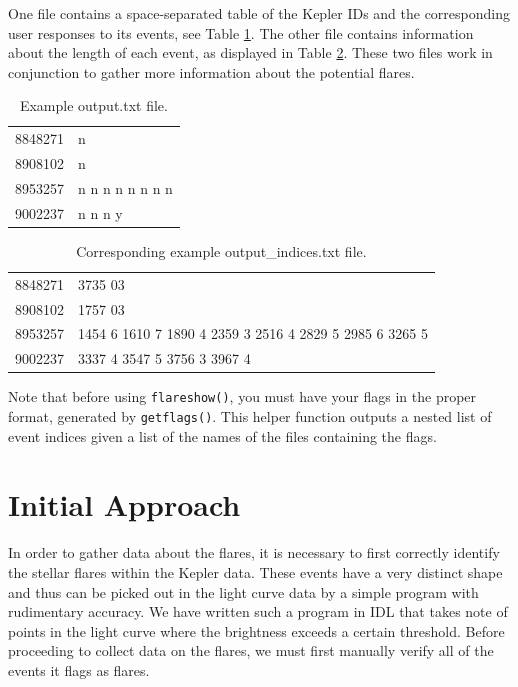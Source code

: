 \documentclass[11pt]{article}
\begin{document}
One file contains a space-separated table of the Kepler IDs and the
corresponding user responses to its events, see Table
\ref{tab:output}.  The other file contains information about the
length of each event, as displayed in Table \ref{tab:outputindices}.
These two files work in conjunction to gather more information about
the potential flares.
\begin{table}[h]
  \centering
  \begin{tabular}{l l}
    8848271 &  n \\
    8908102 &  n \\
    8953257 &  n  n  n  n  n  n  n  n \\
    9002237 &  n  n  n  y \\
  \end{tabular}
\caption{Example output.txt file.}
\label{tab:output}
\end{table}

\begin{table}[!h]
  \centering
  \begin{tabular}{l l}

8848271 &  3735 03 \\
8908102 &  1757 03 \\
8953257 &  1454  6 1610  7 1890  4 2359  3 2516  4 2829  5 2985  6
3265  5 \\
9002237 &  3337  4 3547  5 3756  3 3967  4 \\
\end{tabular}
\caption{Corresponding example output\_indices.txt file.}
\label{tab:outputindices}
\end{table}

Note that before using \verb|flareshow()|, you must have your flags in
the proper format, generated by \verb|getflags()|.  This helper
function outputs a nested list of event indices given a list of the
names of the files containing the flags.

\section{Initial Approach}
\label{sec:initial}
In order to gather data about the flares, it is necessary to first
correctly identify the stellar flares within the Kepler data.  These
events have a very distinct shape and thus can be picked out in the
light curve data by a simple program with rudimentary accuracy.  We
have written such a program in IDL that takes note of points in the
light curve where the brightness exceeds a certain threshold.  Before
proceeding to collect data on the flares, we must first manually
verify all of the events it flags as flares.
\end{document}
